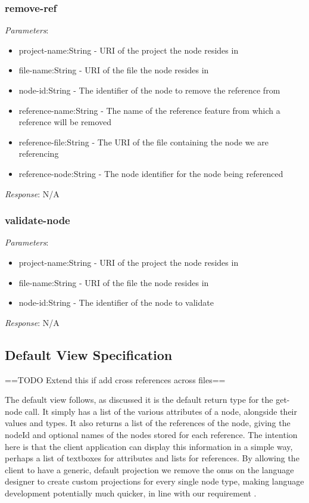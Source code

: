 \documentclass{report}
\begin{document}
\subsubsection{remove-ref}
\emph{Parameters}: 
\begin{itemize}
\item project-name:String - URI of the project the node resides in
\item file-name:String - URI of the file the node resides in
\item node-id:String - The identifier of the node to remove the reference from
\item reference-name:String - The name of the reference feature from which a reference will be removed
\item reference-file:String - The URI of the file containing the node we are referencing
\item reference-node:String - The node identifier for the node being referenced
\end{itemize}
\emph{Response}: N/A

\subsubsection{validate-node}

\emph{Parameters}: 
\begin{itemize}
\item project-name:String - URI of the project the node resides in
\item file-name:String - URI of the file the node resides in
\item node-id:String - The identifier of the node to validate
\end{itemize}
\emph{Response}: N/A

\subsection{Default View Specification}
==TODO Extend this if add cross references across files==

The default view follows, as discussed it is the default return type for the get-node call. It simply has a list of the various attributes of a node, alongside their values and types. It also returns a list of the references of the node, giving the nodeId and optional names of the nodes stored for each reference. The intention here is that the client application can display this information in a simple way, perhaps a list of textboxes for attributes and lists for references. By allowing the client to have a generic, default projection we remove the onus on the language designer to create custom projections for every single node type, making language development potentially much quicker, in line with our requirement \RSetup.

\end{document}

